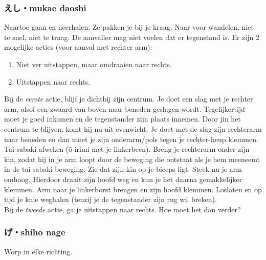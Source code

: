 \subsubsection{えし・mukae daoshi}
Naartoe gaan en neerhalen. Ze pakken je bij je kraag. Naar voor wandelen, niet te snel, niet te traag. De aanvaller mag niet voelen dat er tegenstand is. Er zijn 2 mogelijke acties (voor aanval met rechter arm):\\
\begin{enumerate}
    \item{Niet ver uitstappen, maar omdraaien naar rechts.}
    \item{Uitstappen naar rechts.}
\end{enumerate}
Bij de \textit{eerste} actie, blijf je dichtbij zijn centrum. Je doet een slag met je rechter arm, alsof een zwaard van boven naar beneden geslagen wordt. Tegelijkertijd moet je goed inkomen en de tegenstander zijn plaats innemen. Door jin het centrum te blijven, komt hij nu uit evenwicht. Je doet met de slag zijn rechterarm naar beneden en dan moet je zijn onderarm/pols tegen je rechter-heup klemmen. Tai sabaki afweken (\={o}-irimi met je linkerbeen). Breng je rechterarm onder zijn kin, zodat hij in je arm loopt door de beweging die ontstaat als je hem meeneemt in de tai sabaki beweging. Zie dat zijn kin op je biceps ligt. Steek nu je arm omhoog. Hierdoor draait zijn hoofd weg en kun je het daarna gemakkelijker klemmen. Arm naar je linkerborst brengen en zijn hoofd klemmen. Loslaten en op tijd je knie weghalen (tenzij je de tegenstander zijn rug wil breken).\\
Bij de \textit{tweede} actie, ga je uitstappen naar rechts. Hoe moet het dan verder?


\subsubsection{げ・shih\={o} nage}
Worp in elke richting.

